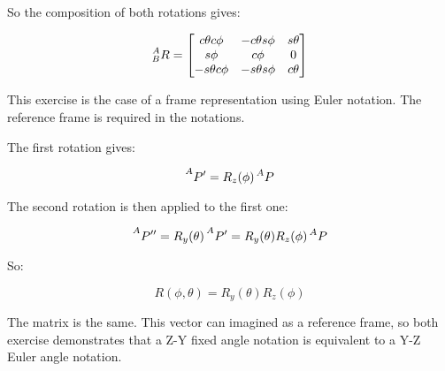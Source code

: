 \documentclass{exam}
\begin{document}
\begin{questions}
So the composition of both rotations gives:

\begin{equation}
  \prescript{A}{B}{R} = \begin{bmatrix}
                          c\theta c\phi  & -c\theta s\phi & s\theta \\
                          s\phi          & c\phi          & 0       \\
                          -s\theta c\phi & -s\theta s\phi & c\theta
                        \end{bmatrix}
\end{equation}

This exercise is the case of a frame representation using Euler notation. The reference frame is required in the notations.

\question

The first rotation gives:

\begin{equation}
  \prescript{A}{}{P'} = R_{z}(\phi) \prescript{A}{}{P}
\end{equation}

The second rotation is then applied to the first one:

\begin{equation}
  \prescript{A}{}{P''} = R_{y}(\theta) \prescript{A}{}{P'} = R_{y}(\theta) R_{z}(\phi) \prescript{A}{}{P}
\end{equation}

So:

\begin{equation}
  R(\phi, \theta) = R_{y}(\theta) R_{z}(\phi)
\end{equation}

The matrix is the same. This vector can imagined as a reference frame, so both exercise demonstrates that a Z-Y fixed angle notation is equivalent to a Y-Z Euler angle notation.

\question

\end{questions}
\end{document}
